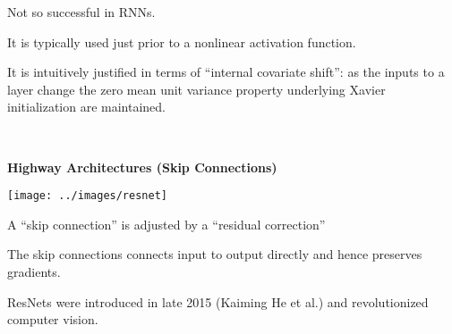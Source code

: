 {\vfill
Not so successful in RNNs.

\vfill
It is typically used just prior to a nonlinear activation function.

\vfill
It is intuitively justified in terms of ``internal covariate shift'':
as the inputs to a layer change the zero mean unit variance property underlying Xavier initialization are maintained.


\vfill
\eject
~ \vfill
\centerline{\bf Highway Architectures (Skip Connections)}
\vfill
\vfill


\vfill
\texttt{[image: ../images/resnet]}
\hfill \begin{minipage}[b]{4in}
  A ``skip connection'' is adjusted by a ``residual correction''

  \bigskip
  The skip connections connects input to output directly and hence preserves gradients.

  \bigskip
  ResNets were introduced in late 2015 (Kaiming He et al.) and revolutionized computer vision.
\end{minipage}


}
